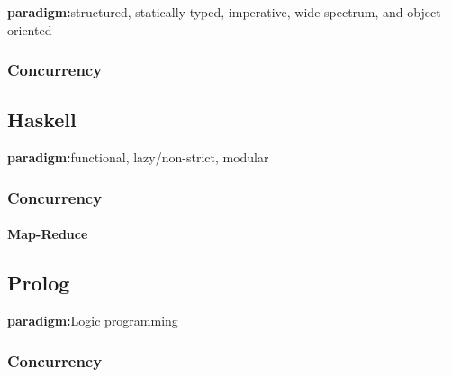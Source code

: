 \documentclass[a4paper,oneside]{article}
\begin{document}
		\textbf{paradigm:}structured, statically typed, imperative, wide-spectrum, and object-oriented

		\subsubsection{Concurrency}

	\subsection{Haskell}

		\textbf{paradigm:}functional, lazy/non-strict, modular

		\subsubsection{Concurrency}
			\paragraph{Map-Reduce}

	\subsection{Prolog}

		\textbf{paradigm:}Logic programming

		\subsubsection{Concurrency}
\end{document}
